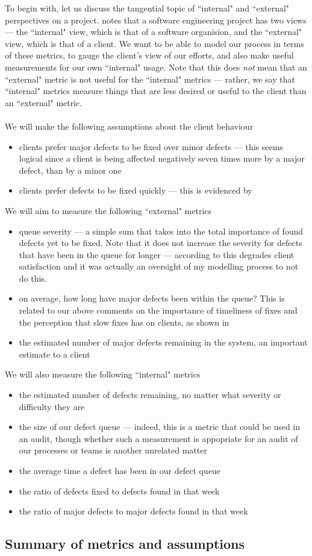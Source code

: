 To begin with, let us discuss the tangential topic of ``internal" and ``external"
perspectives on a project.
\FIXME notes that a software engineering project has two views --- the ``internal" view, which is
that of a software organision, and the ``external" view, which is that of a client.
We want to be able to model our process in terms of these metrics, to gauge the client's view of our
efforts, and also make useful measurements for our own ``internal" usage.
Note that this does {\em not} mean that an ``external" metric is not useful for the ``internal"
metrics --- rather, we say that ``internal" metrics measure things that are less desired or useful
to the client than an ``external" metric.\\
\\
We will make the following assumptions about the client behaviour
\begin{itemize}
	\item clients prefer major defects to be fixed over minor defects --- this seems logical since a
client is being affected negatively seven times more by a major defect, than by a minor one
	\item clients prefer defects to be fixed quickly --- this is evidenced by \FIXME
\end{itemize}

We will aim to measure the following ``external" metrics
\begin{itemize}
	\item queue severity --- a simple sum that takes into the total importance of found defects yet to
be fixed.
	Note that it does not increase the severity for defects that have been in the queue for longer ---
according to \FIXME this degrades client satisfaction and it was actually an oversight of my
modelling process to not do this.
	\item on average, how long have major defects been within the queue?
	This is related to our above comments on the importance of timeliness of fixes and the perception
that slow fixes has on clients, as shown in \FIXME
	\item the estimated number of major defects remaining in the system, an important estimate to a
client
\end{itemize}

We will also measure the following ``internal" metrics
\begin{itemize}
	\item the estimated number of defects remaining, no matter what severity or difficulty they are
	\item the size of our defect queue --- indeed, this is a metric that could be used in an audit,
though whether such a measurement is appopriate for an audit of our processes or teams is another
unrelated matter
	\item the average time a defect has been in our defect queue
	\item the ratio of defects fixed to defects found in that week
	\item the ratio of major defects to major defects found in that week
\end{itemize}

\subsection{Summary of metrics and assumptions}
